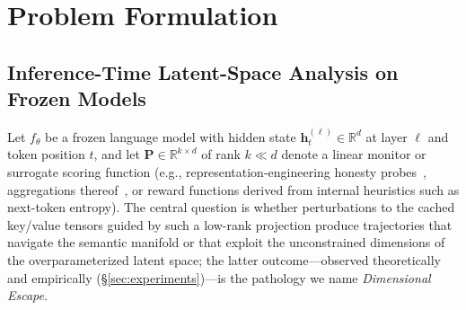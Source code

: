 \section{Problem Formulation}

\subsection{Inference-Time Latent-Space Analysis on Frozen Models}

Let $f_\theta$ be a frozen language model with hidden state $\mathbf{h}_t^{(\ell)} \in \mathbb{R}^d$ at layer $\ell$ and token position $t$, and let $\mathbf{P} \in \mathbb{R}^{k \times d}$ of rank $k \ll d$ denote a linear monitor or surrogate scoring function (e.g., representation-engineering honesty probes~\citep{zou2023repe}, aggregations thereof~\citep{gupta2025rlobfuscation}, or reward functions derived from internal heuristics such as next-token entropy). The central question is whether perturbations to the cached key/value tensors guided by such a low-rank projection produce trajectories that navigate the semantic manifold or that exploit the unconstrained dimensions of the overparameterized latent space; the latter outcome---observed theoretically and empirically (§\ref{sec:experiments})---is the pathology we name \emph{Dimensional Escape}.

